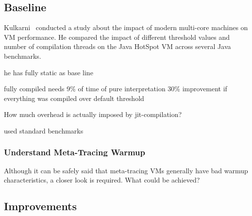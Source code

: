 \subsection{Baseline}


Kulkarni~\cite{kulkarni2011jit} conducted a study about the impact of modern
multi-core machines on VM performance. He compared the impact of different
threshold values and number of compilation threads on the Java HotSpot VM across
several Java benchmarks.

he has fully static as base line

fully compiled needs 9\% of time of pure interpretation
30\% improvement if everything was compiled over default threshold



How much overhead is actually imposed by jit-compilation?

used standard benchmarks


\subsubsection{Understand Meta-Tracing Warmup}

Although it can be safely said that meta-tracing VMs generally have bad warmup
characteristics, a closer look is required. What could be achieved?








\subsection{Improvements}


